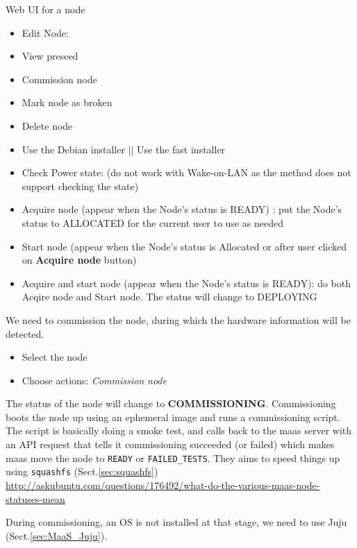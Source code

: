 \begin{mdframed}
Web UI for a node
\begin{itemize}
  \item Edit Node:
  \item View preseed
  \item Commission node
  \item Mark node as broken
  \item Delete node
  \item Use the Debian installer || Use the fast installer
  
  \item Check Power state: (do not work with Wake-on-LAN as the method does not
  support checking the state)
  
  \item Acquire node (appear when the Node's status is READY) : put the Node's
  status to ALLOCATED for the current user to use as needed
  
  \item Start node (appear when the Node's status is Allocated or after user
  clicked on {\bf Acquire node} button)
  
  \item Acquire and start node (appear when the Node's status is READY): do both
  Acqire node and Start node. The status will change to DEPLOYING
   
\end{itemize}

\end{mdframed}


We need to commission the node, during which the hardware information will be detected.
\begin{itemize}
  \item Select the node
  \item Choose actions: {\it Commission node}
\end{itemize}
The status of the node will change to {\bf COMMISSIONING}.
Commissioning boots the node up using an ephemeral image and runs a
commissioning script. The script is basically doing a smoke test, and calls back
to the maas server with an API request that tells it commissioning succeeded (or failed) which
makes maas move the node to \verb!READY! or \verb!FAILED_TESTS!. They aims to speed things up using \verb!squashfs! (Sect.\ref{sec:squashfs})
\url{http://askubuntu.com/questions/176492/what-do-the-various-maas-node-statuses-mean}
  
During commissioning,  an OS is not installed at that stage, we need to
use Juju (Sect.\ref{sec:MaaS_Juju}).



